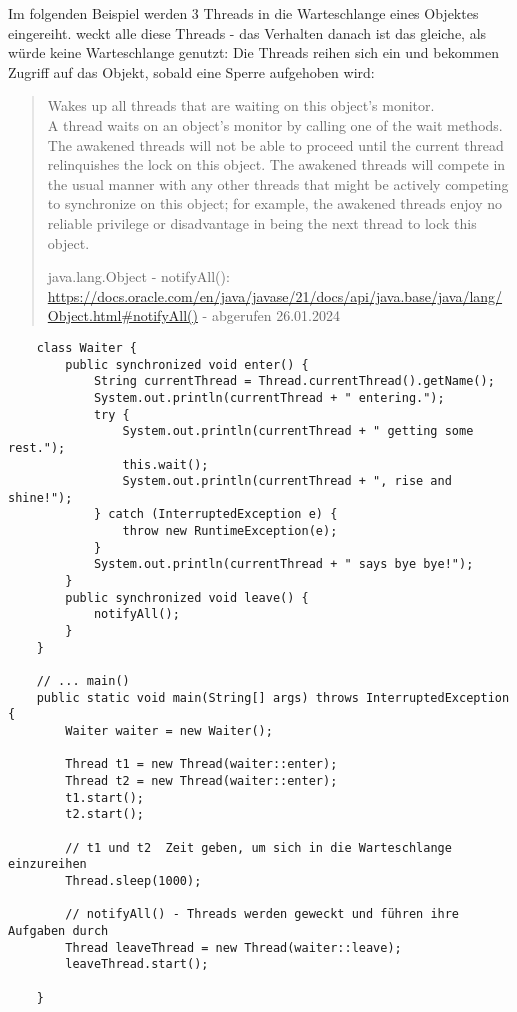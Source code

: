 \noindent
Im folgenden Beispiel werden 3 Threads in die Warteschlange eines Objektes eingereiht.  weckt alle diese Threads - das Verhalten danach ist das gleiche, als würde keine Warteschlange genutzt: Die Threads reihen sich ein und bekommen Zugriff auf das Objekt, sobald eine Sperre aufgehoben wird:
\blockquote[{java.lang.Object - notifyAll(): \url{https://docs.oracle.com/en/java/javase/21/docs/api/java.base/java/lang/Object.html#notifyAll()} - abgerufen 26.01.2024}]{
    Wakes up all threads that are waiting on this object's monitor.\\ A thread waits on an object's monitor by calling one of the wait methods.
    The awakened threads will not be able to proceed until the current thread relinquishes the lock on this object. The awakened threads will compete in the usual manner with any other threads that might be actively competing to synchronize on this object; for example, the awakened threads enjoy no reliable privilege or disadvantage in being the next thread to lock this object.
}

\begin{verbatim}
    class Waiter {
        public synchronized void enter() {
            String currentThread = Thread.currentThread().getName();
            System.out.println(currentThread + " entering.");
            try {
                System.out.println(currentThread + " getting some rest.");
                this.wait();
                System.out.println(currentThread + ", rise and shine!");
            } catch (InterruptedException e) {
                throw new RuntimeException(e);
            }
            System.out.println(currentThread + " says bye bye!");
        }
        public synchronized void leave() {
            notifyAll();
        }
    }

    // ... main()
    public static void main(String[] args) throws InterruptedException {
        Waiter waiter = new Waiter();

        Thread t1 = new Thread(waiter::enter);
        Thread t2 = new Thread(waiter::enter);
        t1.start();
        t2.start();

        // t1 und t2  Zeit geben, um sich in die Warteschlange einzureihen
        Thread.sleep(1000);

        // notifyAll() - Threads werden geweckt und führen ihre Aufgaben durch
        Thread leaveThread = new Thread(waiter::leave);
        leaveThread.start();

    }
\end{verbatim}\\



